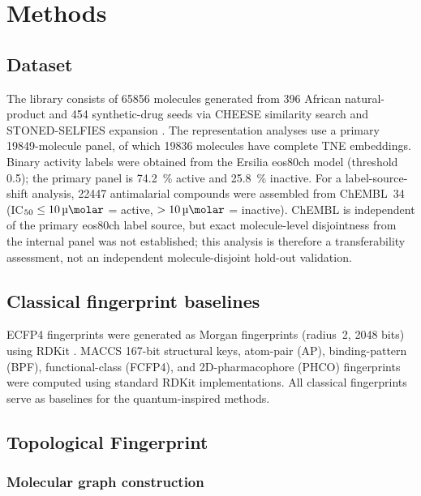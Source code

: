 \documentclass[11pt,a4paper]{article}
\begin{document}

\section{Methods}

\subsection{Dataset}

The library consists of \num{65856} molecules generated from \num{396} African natural-product and \num{454} synthetic-drug seeds via CHEESE similarity search \citep{lzicar_cheese_2024} and STONED-SELFIES expansion \citep{Nigam2021}. The representation analyses use a primary \num{19849}-molecule panel, of which \num{19836} molecules have complete TNE embeddings. Binary activity labels were obtained from the Ersilia eos80ch model (threshold \num{0.5}); the primary panel is \qty{74.2}{\percent} active and \qty{25.8}{\percent} inactive. For a label-source-shift analysis, \num{22447} antimalarial compounds were assembled from ChEMBL~34 (IC$_{50} \leq \SI{10}{\micro\molar}$ = active, $> \SI{10}{\micro\molar}$ = inactive). ChEMBL is independent of the primary eos80ch label source, but exact molecule-level disjointness from the internal panel was not established; this analysis is therefore a transferability assessment, not an independent molecule-disjoint hold-out validation.

\subsection{Classical fingerprint baselines}

ECFP4 fingerprints were generated as Morgan fingerprints (radius~2, \num{2048} bits) using RDKit \citep{rdkit_2024}. MACCS \num{167}-bit structural keys, atom-pair (AP), binding-pattern (BPF), functional-class (FCFP4), and 2D-pharmacophore (PHCO) fingerprints were computed using standard RDKit implementations. All classical fingerprints serve as baselines for the quantum-inspired methods.

\subsection{Topological Fingerprint}

\subsubsection{Molecular graph construction}
\end{document}
